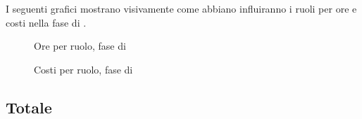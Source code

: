 I seguenti grafici mostrano visivamente come abbiano influiranno i ruoli per ore e costi nella fase di \VV.
\begin{figure}[H]
	\centering
	\caption{Ore per ruolo, fase di \VV}
\end{figure}
\begin{figure}[H]
	\centering
	\caption{Costi per ruolo, fase di \VV}
\end{figure}

\subsection{Totale}
